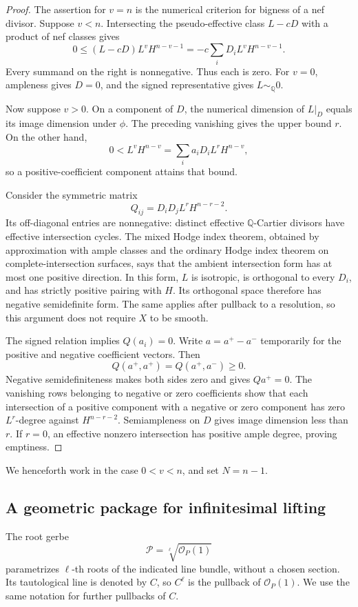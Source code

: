 \documentclass[11pt,letterpaper]{article}
\theoremstyle{definition}
\theoremstyle{remark}
\begin{document}
\begin{proof}
The assertion for $v=n$ is the numerical criterion for bigness of a
nef divisor.  Suppose $v<n$.  Intersecting the pseudo-effective class
$L-cD$ with a product of nef classes gives
\[
 0\le (L-cD)L^vH^{n-v-1}
    =-c\sum_iD_iL^vH^{n-v-1}.
\]
Every summand on the right is nonnegative.  Thus each is zero.
For $v=0$, ampleness gives $D=0$, and the signed representative gives
$L\sim_{\mathbb{Q}}0$.

Now suppose $v>0$.  On a component of $D$, the numerical dimension
of $L|_D$ equals its image dimension under $\phi$.  The preceding
vanishing gives the upper bound $r$.  On the other hand,
\[
 0<L^vH^{n-v}=\sum_i a_iD_iL^rH^{n-v},
\]
so a positive-coefficient component attains that bound.

Consider the symmetric matrix
\[
 Q_{ij}=D_iD_jL^rH^{n-r-2}.
\]
Its off-diagonal entries are nonnegative: distinct effective
$\mathbb{Q}$-Cartier divisors have effective intersection cycles.  The mixed
Hodge index theorem, obtained by approximation with ample classes
and the ordinary Hodge index theorem on complete-intersection
surfaces, says that the ambient intersection form has at most one
positive direction.  In this form, $L$ is isotropic, is orthogonal
to every $D_i$, and has strictly positive pairing with $H$.
Its orthogonal space therefore has negative semidefinite form.
The same applies after pullback to a resolution, so this argument
does not require $X$ to be smooth.

The signed relation implies $Q(a_i)=0$.  Write $a=a^+-a^-$
temporarily for the positive and negative coefficient vectors.
Then
\[
 Q(a^+,a^+)=Q(a^+,a^-)\ge0.
\]
Negative semidefiniteness makes both sides zero and gives
$Qa^+=0$.  The vanishing rows belonging to negative or zero
coefficients show that each intersection of a positive component
with a negative or zero component has zero $L^r$-degree against
$H^{n-r-2}$.  Semiampleness on $D$ gives image dimension less than
$r$.  If $r=0$, an effective nonzero intersection has positive
ample degree, proving emptiness.
\end{proof}

We henceforth work in the case $0<v<n$, and set $N=n-1$.

\subsection{A geometric package for infinitesimal lifting}

The root gerbe
\[
 \mathcal P=\sqrt[\ell]{\mathcal{O}_P(1)}
\]
parametrizes $\ell$-th roots of the indicated line bundle, without
a chosen section.  Its tautological line is denoted by $C$, so
$C^\ell$ is the pullback of $\mathcal{O}_P(1)$.  We use the same notation
for further pullbacks of $C$.
\end{document}
